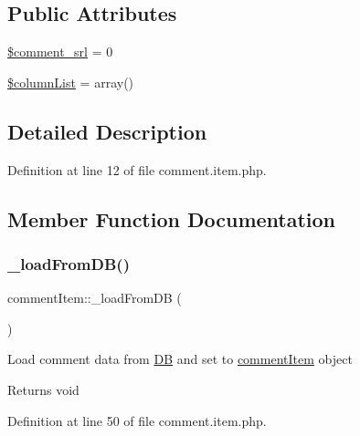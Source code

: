 \subsection*{Public Attributes}
\begin{DoxyCompactItemize}
\item 
\hyperlink{classcommentItem_aec6b057a6e1e71a7b1441fe12682af3b}{\$comment\+\_\+srl} = 0
\item 
\hyperlink{classcommentItem_ad9849e9711f1458b25cf7775336bd6cd}{\$column\+List} = array()
\end{DoxyCompactItemize}


\subsection{Detailed Description}


Definition at line 12 of file comment.\+item.\+php.



\subsection{Member Function Documentation}
\hypertarget{classcommentItem_a0c2c15c69b3584aadf79446147752d80}{}\label{classcommentItem_a0c2c15c69b3584aadf79446147752d80} 
\subsubsection{\texorpdfstring{\+\_\+load\+From\+D\+B()}{\_loadFromDB()}}
{\footnotesize\ttfamily comment\+Item\+::\+\_\+load\+From\+DB (\begin{DoxyParamCaption}{ }\end{DoxyParamCaption})}

Load comment data from \hyperlink{classDB}{DB} and set to \hyperlink{classcommentItem}{comment\+Item} object \begin{DoxyReturn}{Returns}
void 
\end{DoxyReturn}


Definition at line 50 of file comment.\+item.\+php.

\hypertarget{classcommentItem_a5635b46a07b8788e7d2c31ed5b6968d2}{}\label{classcommentItem_a5635b46a07b8788e7d2c31ed5b6968d2} 

